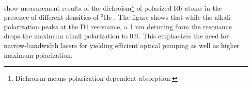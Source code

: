 
 show measurement results of the dichroism\footnote{Dichroism means polarization dependent absorption.} of polarized Rb atoms in the presence of different densities of $^3$He \cite{Lancor2010}. The figure shows that while the alkali polarization peaks at the D1 resonance, a 1 nm detuning from the resonance drops the maximum alkali polarization to 0.9. This emphasizes the need for narrow-bandwidth lasers for yielding efficient optical pumping as well as higher maximum polarization.

